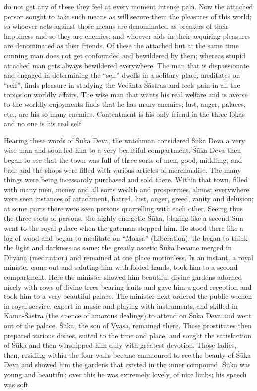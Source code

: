 do not get any of these they feel at every moment intense pain. Now the attached person sought to take such means as will secure them the pleasures of this world; so whoever acts against those means are denominated as breakers of their happiness and so they are enemies; and whoever aids in their acquiring pleasures are denominated as their friends. Of these the attached but at the same time cunning man does not get confounded and bewildered by them; whereas stupid attached man gets always bewildered everywhere. The man that is dispassionate and engaged in determining the ``self'' dwells in a solitary place, meditates on ``self'', finds pleasure in studying the Ved\=anta \'S\=astras and feels pain in all the topics on worldly affairs. The wise man that wants his real welfare and is averse to the worldly enjoyments finds that he has many enemies; lust, anger, palaces, etc., are his so many enemies. Contentment is his only friend in the three lokas and no one is his real self.

Hearing these words of \'S\=uka Deva, the watchman considered \'S\=uka Deva a very wise man and soon led him to a very beautiful compartment. \'S\=uka Deva then began to see that the town was full of three sorts of men, good, middling, and bad; and the shops were filled with various articles of merchandise. The many things were being incessantly purchased and sold there. Within that town, filled with many men, money and all sorts wealth and prosperities, almost everywhere were seen instances of attachment, hatred, lust, anger, greed, vanity and delusion; at some parts there were seen persons quarrelling with each other. Seeing thus the three sorts of persons, the highly energetic \'S\=uka, blazing like a second Sun went to the royal palace when the gateman stopped him. He stood there like a log of wood and began to meditate on ``Moksa'' (Liberation). He began to think the light and darkness as same; the greatly ascetic \'S\=uka became merged in Dhy\=ana (meditation) and remained at one place motionless. In an instant, a royal minister came out and saluting him with folded hands, took him to a second compartment. Here the minister showed him beautiful divine gardens adorned nicely with rows of divine trees bearing fruits and gave him a good reception and took him to a very beautiful palace. The minister next ordered the public women in royal service, expert in music and playing with instruments, and skilled in K\=ama-\'S\=astra (the science of amorous dealings) to attend on \'S\=uka Deva and went out of the palace. \'S\=uka, the son of Vy\=asa, remained there. Those prostitutes then prepared various dishes, suited to the time and place, and sought the satisfaction of \'S\=uka and then worshipped him duly with greatest devotion. Those ladies, then, residing within the four walls became enamoured to see the beauty of \'S\=uka Deva and showed him the gardens that existed in the inner compound. \'S\=uka was young and beautiful; over this he was extremely lovely, of nice limbs; his speech was soft

